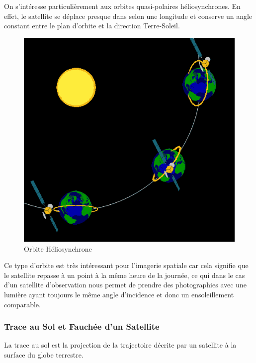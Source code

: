 \documentclass[a4paper, 11pt]{report}
\begin{document}
On s'intéresse particulièrement aux orbites quasi-polaires héliosynchrones. En effet, le satellite se déplace presque dans selon une longitude et conserve un angle constant entre le plan d'orbite et la direction Terre-Soleil.
\begin{figure}[H]
	\begin{center}
		\includegraphics[scale=0.3]{Images/Orbite_Heliosynchrone.png}
		\caption{Orbite Héliosynchrone}
	\end{center}
\end{figure}
Ce type d'orbite est très intéressant pour l'imagerie spatiale car cela signifie que le satellite repasse à un point à la même heure de la journée, ce qui dans le cas d'un satellite d'observation nous permet de prendre des photographies avec une lumière ayant toujours le même angle d'incidence et donc un ensoleillement comparable.
\subsubsection{Trace au Sol et Fauchée d'un Satellite}
La trace au sol est la projection de la trajectoire décrite par un satellite à la surface du globe terrestre.
\end{document}
